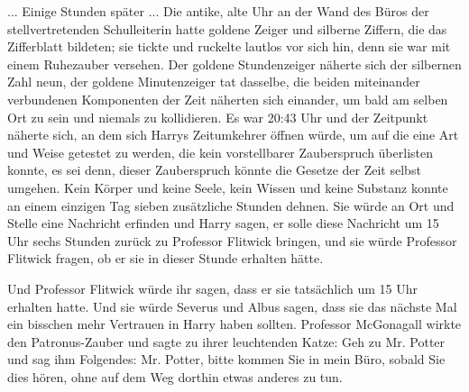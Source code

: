 ... Einige Stunden später ... Die antike, alte Uhr an der Wand des Büros der
stellvertretenden Schulleiterin hatte goldene Zeiger und silberne Ziffern, die
das Zifferblatt bildeten; sie tickte und ruckelte lautlos vor sich hin, denn sie
war mit einem Ruhezauber versehen. Der goldene Stundenzeiger näherte sich der
silbernen Zahl neun, der goldene Minutenzeiger tat dasselbe, die beiden
miteinander verbundenen Komponenten der Zeit näherten sich einander, um bald am
selben Ort zu sein und niemals zu kollidieren. Es war 20:43 Uhr und der
Zeitpunkt näherte sich, an dem sich Harrys Zeitumkehrer öffnen würde, um auf die
eine Art und Weise getestet zu werden, die kein vorstellbarer Zauberspruch
überlisten konnte, es sei denn, dieser Zauberspruch könnte die Gesetze der Zeit
selbst umgehen. Kein Körper und keine Seele, kein Wissen und keine Substanz
konnte an einem einzigen Tag sieben zusätzliche Stunden dehnen. Sie würde an Ort
und Stelle eine Nachricht erfinden und Harry sagen, er solle diese Nachricht um
15 Uhr sechs Stunden zurück zu Professor Flitwick bringen, und sie würde
Professor Flitwick fragen, ob er sie in dieser Stunde erhalten hätte.

Und Professor Flitwick würde ihr sagen, dass er sie tatsächlich um 15 Uhr
erhalten hatte. Und sie würde Severus und Albus sagen, dass sie das nächste Mal
ein bisschen mehr Vertrauen in Harry haben sollten. Professor McGonagall wirkte
den Patronus-Zauber und sagte zu ihrer leuchtenden Katze: \glqq{}Geh zu Mr.
Potter und sag ihm Folgendes: Mr. Potter, bitte kommen Sie in mein Büro, sobald
Sie dies hören, ohne auf dem Weg dorthin etwas anderes zu tun.

